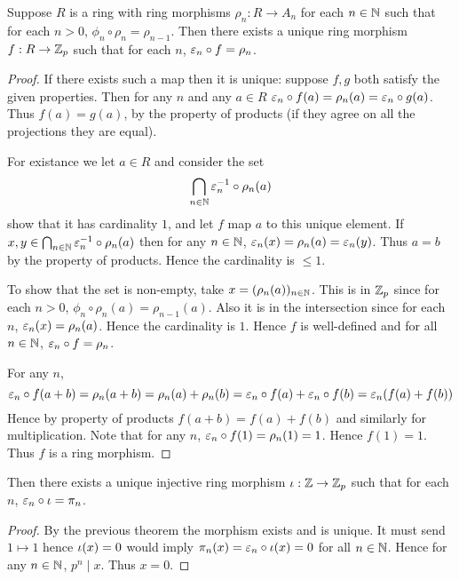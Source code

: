 \begin{prop}
    Suppose $R$ is a ring with ring morphisms 
    $\rho_n : R \to A_n$ for each $n \in \mathbb{N}$
    such that for each $n > 0$, 
    $\phi_n \circ \rho_n = \rho_{n-1}$.
    Then there exists a unique ring morphism $f : R \to \mathbb{Z}_p$
    such that for each $n$, 
    $\varepsilon_n \circ f = \rho_n$.
\end{prop}
\begin{proof}
    If there exists such a map then it is unique:
    suppose $f,g$ both satisfy the given properties.
    Then for any $n$ and any $a \in R$
    $\varepsilon_n \circ f (a)= \rho_n (a) = \varepsilon_n \circ g (a)$.
    Thus $f(a) = g(a)$, by the property of products
    (if they agree on all the projections they are equal).

    For existance we let $a \in R$ and consider the set
    \[\bigcap_{n \in \mathbb{N}} {\varepsilon_n^{-1} \circ \rho_n (a)}\]
    show that it has cardinality $1$,
    and let $f$ map $a$ to this unique element.
    If $x,y \in \bigcap_{n \in \mathbb{N}} {\varepsilon_n^{-1} \circ \rho_n (a)}$
    then for any $n \in \mathbb{N}$, 
    $\varepsilon_n (x) = \rho_n (a) = \varepsilon_n (y)$.
    Thus $a = b$ by the property of products.
    Hence the cardinality is $\le 1$.

    To show that the set is non-empty,
    take $x = (\rho_n (a))_{n \in \mathbb{N}}$.
    This is in $\mathbb{Z}_p$ since for each $n>0$,
    $\phi_n \circ \rho_n(a) = \rho_{n - 1}(a)$.
    Also it is in the intersection since for each $n$,
    $\varepsilon_n(x) = \rho_n(a)$. 
    Hence the cardinality is $1$.
    Hence $f$ is well-defined and for all $n \in \mathbb{N}$, 
    $\varepsilon_n \circ f = \rho_n$.

    For any $n$, 
    \[\varepsilon_n \circ f (a + b) = \rho_n (a + b) = \rho_n (a) + \rho_n (b)
    = \varepsilon_n \circ f(a) + \varepsilon_n \circ f(b) = \varepsilon_n (f(a) + f(b))\]
    Hence by property of products $f(a + b) = f(a) + f(b)$
    and similarly for multiplication.
    Note that for any $n$, 
    $\varepsilon_n \circ f(1) = \rho_n (1) = 1$.
    Hence $f(1) = 1$.
    Thus $f$ is a ring morphism.
\end{proof}

\begin{cor}
    Then there exists a unique injective ring morphism 
    $\iota : \mathbb{Z} \to \mathbb{Z}_p$
    such that for each $n$, 
    $\varepsilon_n \circ \iota = \pi_n$.
\end{cor}
\begin{proof}
    By the previous theorem the morphism exists and is unique.
    It must send $1 \mapsto 1$ hence $\iota(x) = 0$ would imply
    $\pi_n (x) = \varepsilon_n \circ \iota(x) = 0$ for all $n \in \mathbb{N}$.
    Hence for any $n \in \mathbb{N}$, 
    $p^n \mid x$.
    Thus $x = 0$.
\end{proof}

